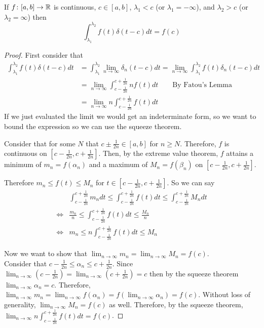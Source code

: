 \documentclass[notes]{subfiles}
\begin{document}
\begin{theorem}
    If $f\colon [a, b] \to \mathbb{R}$ is continuous, $c \in [a, b]$, $\lambda_1 < c$ (or $\lambda_1 = -\infty$), and $\lambda_2 > c$ (or $\lambda_2 = \infty$) then
    \[
        \int_{\lambda_1}^{\lambda_2} f(t)\delta(t - c)dt = f(c)
    \]
\end{theorem}
\begin{proof}
    First consider that
    \begin{align*}
        \int_{\lambda_1}^{\lambda_2} f(t)\delta(t - c)dt
        &= \int_{\lambda_1}^{\lambda_2} \lim_{n\to\infty} \delta_n(t - c) dt
        = \lim_{n\to\infty} \int_{\lambda_1}^{\lambda_2} f(t) \delta_n(t - c) dt \\
        &= \lim_{n\to\infty} \int_{c - \frac{1}{2n}}^{c + \frac{1}{2n}} nf(t)dt \qquad \text{By Fatou's Lemma} \\
        &= \lim_{n\to\infty} n \int_{c - \frac{1}{2n}}^{c + \frac{1}{2n}} f(t)dt
    \end{align*}
    If we just evaluated the limit we would get an indeterminate form, so we want to bound the expression so we can use the squeeze theorem.

    Consider that for some $N$ that $c \pm \frac{1}{2n} \in [a, b]$ for $n \geq N$. Therefore, $f$ is continuous on $\left[c - \frac{1}{2n}, c + \frac{1}{2n}\right]$. Then, by the extreme value theorem, $f$ attains a minimum of $m_n = f(\alpha_n)$ and a maximum of $M_n = f(\beta_n)$ on $\left[c - \frac{1}{2n}, c + \frac{1}{2n}\right]$.

    Therefore $m_n \leq f(t) \leq M_n$ for $t \in \left[c - \frac{1}{2n}, c + \frac{1}{2n}\right]$. So we can say
    \begin{align*}
        &\int_{c - \frac{1}{2n}}^{c + \frac{1}{2n}} m_n dt \leq \int_{c - \frac{1}{2n}}^{c + \frac{1}{2n}} f(t)dt \leq \int_{c - \frac{1}{2n}}^{c + \frac{1}{2n}} M_n dt \\
        \iff& \frac{m_n}{n} \leq \int_{c - \frac{1}{2n}}^{c + \frac{1}{2n}} f(t)dt \leq \frac{M_n}{n} \\
        \iff& m_n \leq n\int_{c - \frac{1}{2n}}^{c + \frac{1}{2n}} f(t)dt \leq M_n
    \end{align*}

    Now we want to show that $\lim_{n\to\infty} m_n = \lim_{n\to\infty} M_n = f(c)$. \\ Consider that $c - \frac{1}{2n} \leq \alpha_n \leq c + \frac{1}{2n}$. Since $\lim_{n\to\infty} \left(c - \frac{1}{2n}\right) = \lim_{n\to\infty} \left(c + \frac{1}{2n}\right) = c$ then by the squeeze theorem $\lim_{n\to\infty} \alpha_n = c$. Therefore, $\lim_{n\to\infty} m_n = \lim_{n\to\infty} f(\alpha_n) = f\left(\lim_{n\to\infty} \alpha_n\right) = f(c)$. Without loss of generality, $\lim_{n\to\infty} M_n = f(c)$ as well. Therefore, by the squeeze theorem, $\lim_{n\to\infty} n\int_{c - \frac{1}{2n}}^{c + \frac{1}{2n}} f(t)dt = f(c)$.
\end{proof}
\end{document}
